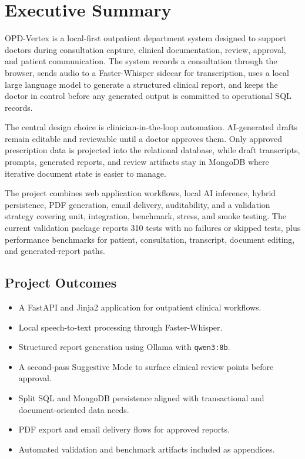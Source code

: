 \section{Executive Summary}

OPD-Vertex is a local-first outpatient department system designed to support doctors during consultation capture, clinical documentation, review, approval, and patient communication. The system records a consultation through the browser, sends audio to a Faster-Whisper sidecar for transcription, uses a local large language model to generate a structured clinical report, and keeps the doctor in control before any generated output is committed to operational SQL records.

\begin{summarybox}
The central design choice is clinician-in-the-loop automation. AI-generated drafts remain editable and reviewable until a doctor approves them. Only approved prescription data is projected into the relational database, while draft transcripts, prompts, generated reports, and review artifacts stay in MongoDB where iterative document state is easier to manage.
\end{summarybox}

The project combines web application workflows, local AI inference, hybrid persistence, PDF generation, email delivery, auditability, and a validation strategy covering unit, integration, benchmark, stress, and smoke testing. The current validation package reports 310 tests with no failures or skipped tests, plus performance benchmarks for patient, consultation, transcript, document editing, and generated-report paths.

\subsection{Project Outcomes}

\begin{itemize}
  \item A FastAPI and Jinja2 application for outpatient clinical workflows.
  \item Local speech-to-text processing through Faster-Whisper.
  \item Structured report generation using Ollama with \texttt{qwen3:8b}.
  \item A second-pass Suggestive Mode to surface clinical review points before approval.
  \item Split SQL and MongoDB persistence aligned with transactional and document-oriented data needs.
  \item PDF export and email delivery flows for approved reports.
  \item Automated validation and benchmark artifacts included as appendices.
\end{itemize}

